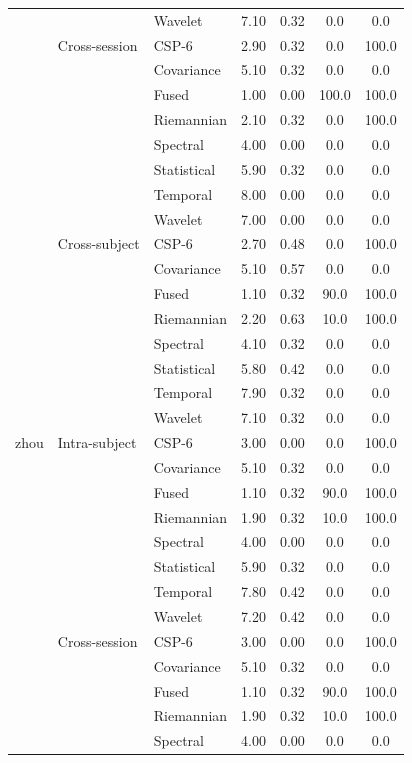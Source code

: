 \begin{table}[t]
\begin{tabular}{lllcccc}
 &  & Wavelet & 7.10 & 0.32 & 0.0 & 0.0 \\
\addlinespace[3pt]
 & Cross-session & CSP-6 & 2.90 & 0.32 & 0.0 & 100.0 \\
 &  & Covariance & 5.10 & 0.32 & 0.0 & 0.0 \\
 &  & Fused & 1.00 & 0.00 & 100.0 & 100.0 \\
 &  & Riemannian & 2.10 & 0.32 & 0.0 & 100.0 \\
 &  & Spectral & 4.00 & 0.00 & 0.0 & 0.0 \\
 &  & Statistical & 5.90 & 0.32 & 0.0 & 0.0 \\
 &  & Temporal & 8.00 & 0.00 & 0.0 & 0.0 \\
 &  & Wavelet & 7.00 & 0.00 & 0.0 & 0.0 \\
\addlinespace[3pt]
 & Cross-subject & CSP-6 & 2.70 & 0.48 & 0.0 & 100.0 \\
 &  & Covariance & 5.10 & 0.57 & 0.0 & 0.0 \\
 &  & Fused & 1.10 & 0.32 & 90.0 & 100.0 \\
 &  & Riemannian & 2.20 & 0.63 & 10.0 & 100.0 \\
 &  & Spectral & 4.10 & 0.32 & 0.0 & 0.0 \\
 &  & Statistical & 5.80 & 0.42 & 0.0 & 0.0 \\
 &  & Temporal & 7.90 & 0.32 & 0.0 & 0.0 \\
 &  & Wavelet & 7.10 & 0.32 & 0.0 & 0.0 \\
\midrule
zhou & Intra-subject & CSP-6 & 3.00 & 0.00 & 0.0 & 100.0 \\
 &  & Covariance & 5.10 & 0.32 & 0.0 & 0.0 \\
 &  & Fused & 1.10 & 0.32 & 90.0 & 100.0 \\
 &  & Riemannian & 1.90 & 0.32 & 10.0 & 100.0 \\
 &  & Spectral & 4.00 & 0.00 & 0.0 & 0.0 \\
 &  & Statistical & 5.90 & 0.32 & 0.0 & 0.0 \\
 &  & Temporal & 7.80 & 0.42 & 0.0 & 0.0 \\
 &  & Wavelet & 7.20 & 0.42 & 0.0 & 0.0 \\
\addlinespace[3pt]
 & Cross-session & CSP-6 & 3.00 & 0.00 & 0.0 & 100.0 \\
 &  & Covariance & 5.10 & 0.32 & 0.0 & 0.0 \\
 &  & Fused & 1.10 & 0.32 & 90.0 & 100.0 \\
 &  & Riemannian & 1.90 & 0.32 & 10.0 & 100.0 \\
 &  & Spectral & 4.00 & 0.00 & 0.0 & 0.0 \\

\end{tabular}
\end{table}
